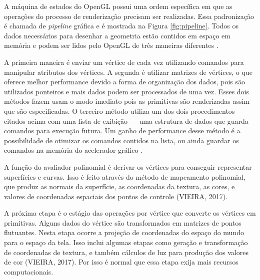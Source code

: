 A máquina de estados do OpenGL possui uma ordem específica em que as operações do processo de renderização precisam ser realizadas. Essa padronização é chamada de \textit{pipeline} gráfica e é mostrada na Figura \ref{fig:pipeline}. Todos os dados necessários para desenhar a geometria estão contidos em espaço em memória e podem ser lidos pelo OpenGL de três maneiras diferentes \cite{GLSLBook}. 

\begin{figure}[h!]
	\centering
\end{figure}
\nocite{pipeline}

A primeira maneira é enviar um vértice de cada vez utilizando comandos para manipular atributos dos vértices. A segunda é utilizar matrizes de vértices, o que oferece melhor performance devido a forma de organização dos dados, pois são utilizados ponteiros e mais dados podem ser processados de uma vez. Esses dois métodos fazem usam o modo imediato pois as primitivas são renderizadas assim que são especificadas. O terceiro método utiliza um dos dois procedimentos citados acima com uma lista de exibição --- uma estrutura de dados que guarda comandos para execução futura. Um ganho de performance desse método é a possibilidade de otimizar os comandos contidos na lista, ou ainda guardar os comandos na memória do acelerador gráfico \cite{GLSLBook}. 
	
A função do avaliador polinomial é derivar os vértices para conseguir representar superfícies e curvas. Isso é feito através do método de mapeamento polinomial, que produz as normais da superfície, as coordenadas da textura, as cores, e valores de coordenadas espaciais dos pontos de controle (VIEIRA, 2017)\nocite{pipelnRef}.

A próxima etapa é o estágio das operações por vértice que converte os vértices em primitivas. Alguns dados do vértice são transformados em matrizes de pontos flutuantes. Nesta etapa ocorre a projeção de coordenadas do espaço do mundo para o espaço da tela. Isso inclui algumas etapas como geração e transformação de coordenadas de textura, e também cálculos de luz para produção dos valores de cor (VIEIRA, 2017). Por isso é normal que essa etapa exija mais recursos computacionais. 

